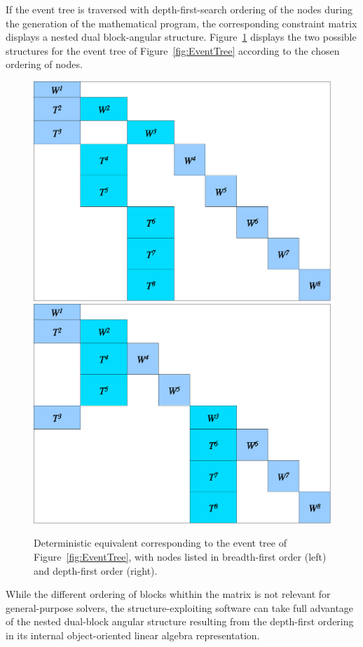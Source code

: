 If the event tree is traversed with depth-first-search ordering of the 
nodes during the generation of the mathematical program, the 
corresponding constraint matrix displays a nested dual block-angular 
structure.
Figure~\ref{fig:deteq} displays the two possible structures 
for the event tree of Figure~\ref{fig:EventTree} according 
to the chosen ordering of nodes.
%
\begin{figure}[ht]
  \centering
    \includegraphics[scale=0.37]{figures/deteq-bfs.eps} \hfill
    \includegraphics[scale=0.37]{figures/deteq-dfs.eps}
    \caption{Deterministic equivalent corresponding to the event tree 
             of Figure~\ref{fig:EventTree}, with nodes listed in breadth-first 
             order (left) and depth-first order (right).}
    \label{fig:deteq}
\end{figure}
%
While the different ordering of blocks whithin the matrix is not 
relevant for general-purpose solvers, the structure-exploiting
software \OOPS \cite{GondzioGrothey07,GondzioSarkissian} can take 
full advantage of the nested dual-block angular structure resulting
from the depth-first ordering in its internal object-oriented
linear algebra representation.

